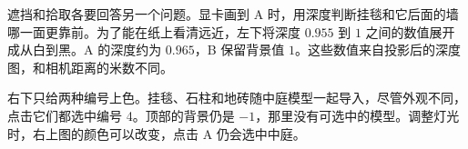 

遮挡和拾取各要回答另一个问题。显卡画到 A 时，用深度判断挂毯和它后面的墙哪一面更靠前。为了能在纸上看清远近，左下将深度 $0.955$ 到 $1$ 之间的数值展开成从白到黑。A 的深度约为 $0.965$，B 保留背景值 $1$。这些数值来自投影后的深度图，和相机距离的米数不同。

右下只给两种编号上色。挂毯、石柱和地砖随中庭模型一起导入，尽管外观不同，点击它们都选中编号 4。顶部的背景仍是 $-1$，那里没有可选中的模型。调整灯光时，右上图的颜色可以改变，点击 A 仍会选中中庭。

